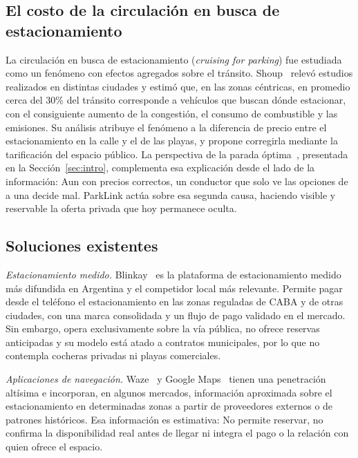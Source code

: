 \documentclass[conference,a4paper]{IEEEtran}
\begin{document}
\subsection{El costo de la circulación en busca de estacionamiento}

La circulación en busca de estacionamiento (\textit{cruising for parking}) fue estudiada como un fenómeno con efectos agregados sobre el tránsito. Shoup~\cite{shoup2005,shoup2006} relevó estudios realizados en distintas ciudades y estimó que, en las zonas céntricas, en promedio cerca del 30\% del tránsito corresponde a vehículos que buscan dónde estacionar, con el consiguiente aumento de la congestión, el consumo de combustible y las emisiones. Su análisis atribuye el fenómeno a la diferencia de precio entre el estacionamiento en la calle y el de las playas, y propone corregirla mediante la tarificación del espacio público. La perspectiva de la parada óptima~\cite{macqueen1960,tamaki1988}, presentada en la Sección~\ref{sec:intro}, complementa esa explicación desde el lado de la información: Aun con precios correctos, un conductor que solo ve las opciones de a una decide mal. ParkLink actúa sobre esa segunda causa, haciendo visible y reservable la oferta privada que hoy permanece oculta.

\subsection{Soluciones existentes}

\textit{Estacionamiento medido.} Blinkay~\cite{blinkay} es la plataforma de estacionamiento medido más difundida en Argentina y el competidor local más relevante. Permite pagar desde el teléfono el estacionamiento en las zonas reguladas de CABA y de otras ciudades, con una marca consolidada y un flujo de pago validado en el mercado. Sin embargo, opera exclusivamente sobre la vía pública, no ofrece reservas anticipadas y su modelo está atado a contratos municipales, por lo que no contempla cocheras privadas ni playas comerciales.

\textit{Aplicaciones de navegación.} Waze~\cite{waze} y Google Maps~\cite{googlemaps} tienen una penetración altísima e incorporan, en algunos mercados, información aproximada sobre el estacionamiento en determinadas zonas a partir de proveedores externos o de patrones históricos. Esa información es estimativa: No permite reservar, no confirma la disponibilidad real antes de llegar ni integra el pago o la relación con quien ofrece el espacio.
\end{document}
